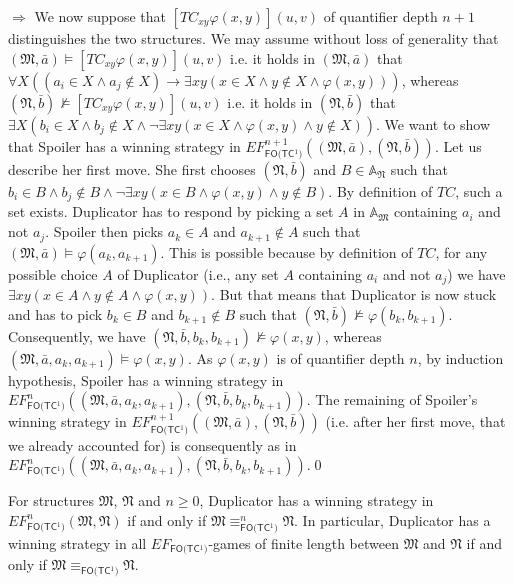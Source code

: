 \documentclass{LMCS}
\newcommand{\frM}{\mathfrak{M}}
\newcommand{\frN}{\mathfrak{N}}
\newcommand{\fotc}{\textsf{FO(TC$^1$)}\xspace}
\begin{document}
\begin{iteMize}{$\Rightarrow$}
We now suppose that $[TC_{xy} \varphi(x,y)](u,v)$ of
quantifier depth $n+1$ distinguishes the two structures. We may assume without loss of generality that
$(\frM, \bar{a}) \models[TC_{xy} \varphi(x,y)](u,v)$ i.e. it holds
in $(\frM, \bar{a})$ that $\forall X ((a_i \in X \wedge a_j \not
\in X) \rightarrow \exists x y (x \in X \wedge y \not \in X \wedge
\varphi(x,y)))$, whereas $(\frN, \bar{b}) \not \models[TC_{xy}
\varphi(x,y)](u,v)$ i.e. it holds in $(\frN, \bar{b})$ that
$\exists X (b_i \in X \wedge b_j \not \in X \wedge \neg \exists x
y (x \in X \wedge \varphi(x, y) \wedge y \not \in X))$. We want to
show that Spoiler has a winning strategy  in
$EF_\fotc^{n+1}((\frM, \bar{a}), (\frN, \bar{b}))$. Let us
describe her first move. She first chooses $(\frN, \bar{b})$ and
$B \in \mathbb{A}_\frN$ such that $b_i \in B \wedge b_j \not \in B
\wedge \neg \exists x y (x \in B \wedge \varphi(x,y) \wedge y \not
\in B)$. By definition of $TC$, such a set exists. Duplicator has
to respond by picking a set $A$ in $\mathbb{A}_\frM$ containing $a_i$ and not $a_j$. Spoiler then
picks $a_k \in A$ and $a_{k+1} \not \in A$ such that $(\frM,
\bar{a}) \models \varphi(a_k,a_{k+1})$. This is possible because
by definition of $TC$, for any possible choice $A$ of Duplicator (i.e., any set $A$ containing $a_i$ and not $a_j$)
we have $\exists x y (x \in A \wedge y \not \in A \wedge
\varphi(x,y))$. But that means that Duplicator is now stuck and
has to pick $b_k \in B$ and $b_{k+1} \not \in B$ such that $(\frN,
\bar{b}) \not \models \varphi(b_k,b_{k+1})$. Consequently, we have
$(\frN, \bar{b}, b_k, b_{k+1}) \not \models \varphi(x, y)$,
whereas $(\frM, \bar{a}, a_k, a_{k+1}) \models \varphi(x, y)$. As
$\varphi(x,y)$ is of quantifier depth $n$, by induction
hypothesis, Spoiler has a winning strategy in $EF_\fotc^n((\frM,
\bar{a}, a_k, a_{k+1}),(\frN, \bar{b}, b_k, b_{k+1}))$. The
remaining of Spoiler's winning strategy in $EF_\fotc^{n+1}((\frM,
\bar{a}),(\frN, \bar{b}))$ (i.e. after her first move, that we
already accounted for) is consequently as in $EF_\fotc^n((\frM,
\bar{a}, a_k, a_{k+1}),(\frN, \bar{b}, b_k, b_{k+1}))$.\qed
\end{iteMize}

\begin{cor}
For structures $\frM$, $\frN$ and $n \geq 0$, Duplicator has a winning strategy in $EF_\fotc^n(\frM,\frN)$ if and only if $\frM \equiv_\fotc^n
\frN$. In particular, Duplicator has a winning strategy in all $EF_\fotc$-games of finite length between $\frM$ and $\frN$ if and only if $\frM
\equiv_\fotc \frN$.
\end{cor}
\end{document}
